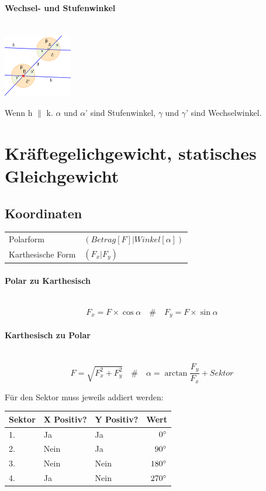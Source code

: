 \documentclass[a4paper,10pt]{article}
\newcommand{\lbparagraph}[1]{\paragraph{#1}\mbox{}\\}
\newcommand{\eqsp}[1]{\quad\#\quad}
\begin{document}
\lbparagraph{Wechsel- und Stufenwinkel}

\includegraphics[height=103px,keepaspectratio]{stufen-wechselwinkel}

Wenn h $\parallel$ k. $\alpha$ und $\alpha$' sind Stufenwinkel, $\gamma$ und $\gamma$' sind Wechselwinkel.

%

\section{Kräftegelichgewicht, statisches Gleichgewicht}

\subsection{Koordinaten}

\begin{tabular}{l l}
    Polarform & $(Betrag[F]|Winkel[\alpha])$ \\
    Karthesische Form & $(F_x|F_y)$
\end{tabular}

\lbparagraph{Polar zu Karthesisch}

\begin{equation}
    F_x = F \times \cos{\alpha}
    \eqsp{}
    F_y = F \times \sin{\alpha}
\end{equation}

\lbparagraph{Karthesisch zu Polar}

\begin{equation}
    F = \sqrt{F_x^2 + F_y^2}
    \eqsp{}
    \alpha = \arctan{\frac{F_y}{F_x}} + Sektor
\end{equation}

Für den Sektor muss jeweils addiert werden:

\begin{tabular}{l|l|l|r}
    Sektor & X Positiv? & Y Positiv? & Wert \\
    \hline
    1. & Ja & Ja & $0\degree$ \\
    2. & Nein & Ja & $90\degree$ \\
    3. & Nein & Nein & $180\degree$ \\
    4. & Ja & Nein & $270\degree$
\end{tabular}
\end{document}

